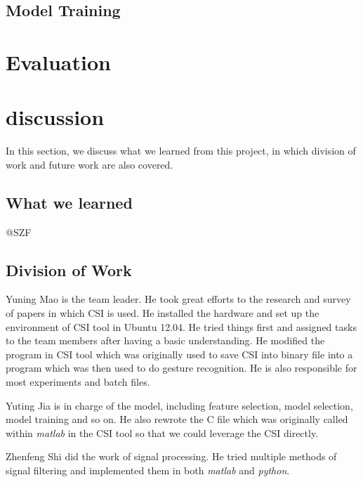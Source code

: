 \documentclass[conference]{IEEEtran}
\begin{document}
\subsection{Model Training}


\section{Evaluation} \label{section-evaluation}


\section{discussion} \label{section-discussion}

In this section, we discuss what we learned from this project, in which division of work and future work are also covered.

\subsection{What we learned}
@SZF
\subsection{Division of Work}
Yuning Mao is the team leader. He took great efforts to the research and survey of papers in which CSI is used. He installed the hardware and set up the environment of CSI tool in Ubuntu 12.04. He tried things first and assigned tasks to the team members after having a basic understanding. He modified the program in CSI tool which was originally used to save CSI into binary file into a program which was then used to do gesture recognition. He is also responsible for most experiments and batch files.

Yuting Jia is in charge of the model, including feature selection, model selection, model training and so on. He also rewrote the C file which was originally called within \emph{matlab} in the CSI tool so that we could leverage the CSI directly.

Zhenfeng Shi did the work of signal processing. He tried multiple methods of signal filtering and implemented them in both \emph{matlab} and \emph{python}.
\end{document}
